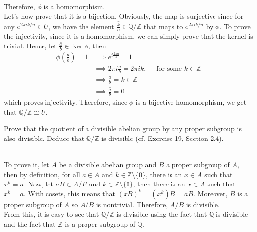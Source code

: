 \begin{solution}
\begin{enumerate}[label = \textbf{(\alph*)}]
\begin{align*}
        \end{align*}
        Therefore, $\phi$ is a homomorphism. \\
        Let's now prove that it is a bijection. Obviously, the map is surjective since for any $e^{2\pi i k / n} \in U$, we have the element $\overline{\frac{k}{n}} \in \mathbb{Q/Z}$ that maps to $e^{2\pi i k / n}$ by $\phi$. To prove the injectivity, since it is a homomorphism, we can simply prove that the kernel is trivial. Hence, let $\overline{\frac{a}{b}} \in \ker\phi$, then
        \begin{align*}
            \phi\left(\overline{\frac{a}{b}}\right) = 1 &\implies e^{i\frac{2\pi a}{b}} = 1 \\
            &\implies 2\pi i \frac{a}{b} = 2\pi i k, \quad \text{ for some }k \in \mathbb{Z} \\
            &\implies \frac{a}{b} = k \in \mathbb{Z} \\
            &\implies \overline{\frac{a}{b}} = \overline{0}
        \end{align*}
        which proves injectivity. Therefore, since $\phi$ is a bijective homomorphism, we get that $\mathbb{Q/Z} \cong U$.\\
    \end{enumerate}
\end{solution}

\begin{exercise}
    Prove that the quotient of a divisible abelian group by any proper subgroup is also divisible. Deduce that $\mathbb{Q/Z}$ is divisible (cf. Exercise 19, Section 2.4). \\
\end{exercise}

\begin{solution}
    \\ To prove it, let $A$ be a divisible abelian group and $B$ a proper subgroup of $A$, then by definition, for all $a \in A$ and $k \in \mathbb{Z}\setminus\{0\}$, there is an $x\in A$ such that $x^k = a$. Now, let $aB \in A/B$ and $k \in \mathbb{Z}\setminus\{0\}$, then there is an $x\in A$ such that $x^k = a$. With cosets, this means that $(xB)^k = (x^k)B = aB$. Moreover, $B$ is a proper subgroup of $A$ so $A/B$ is nontrivial. Therefore, $A/B$ is divisible. \\
    From this, it is easy to see that $\mathbb{Q/Z}$ is divisible using the fact that $\mathbb{Q}$ is divisible and the fact that $\mathbb{Z}$ is a proper subgroup of $\mathbb{Q}$. \\
\end{solution}

